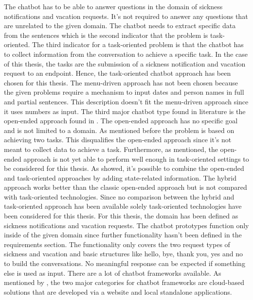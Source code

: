 The chatbot has to be able to answer questions in the domain of sickness notifications 
and vacation requests.
It's not required to answer any questions that are unrelated to the given domain.
The chatbot needs to extract specific data from the sentences which is the second 
indicator that the problem is task-oriented.
The third indicator for a task-oriented problem is that the chatbot has to collect 
information from the 
conversation to achieve a specific task.
In the case of this thesis, the tasks are the submission of a sickness notification
and vacation request to an endpoint. 
Hence, the task-oriented chatbot approach has been chosen for this thesis.
The menu-driven approach has not been chosen because the given problems require a mechanism 
to input dates and person names in full and partial sentences.
This description doesn't fit the menu-driven approach since it uses numbers as input.
The third major chatbot type found in literature is the open-ended approach found in 
\citet{williams2017hybrid, bordes2016learning, rahman2017programming}.
The open-ended approach has no specific goal and is not limited to a domain.
As mentioned before the problem is based on achieving two tasks.
This disqualifies the open-ended approach since it's not meant to
collect data to achieve a task.
Furthermore, as \citet{bordes2016learning} mentioned, the open-ended approach is not 
yet able to perform well enough in task-oriented settings to be considered for this 
thesis.
As \citet{williams2017hybrid} showed, it's possible to combine the open-ended and 
task-oriented approaches by adding state-related information.
The hybrid approach works better than the classic open-ended approach but 
is not compared with task-oriented technologies.
Since no comparison between the hybrid and task-oriented approach has been available 
solely task-oriented technologies have been considered for this thesis.
For this thesis, the domain has been defined as sickness notifications and vacation requests.
The chatbot prototypes function only inside of the given domain since further 
functionality hasn't been defined in the requirements section.
The functionality only covers the two request types of sickness and vacation and basic 
structures like hello, bye, thank you, yes and no to build the conversations.
No meaningful response can be expected if something else is used as input.
There are a lot of chatbot frameworks available.
As mentioned by \citet{kane2016role}, the two major categories for chatbot frameworks 
are cloud-based solutions that are developed via a website and local standalone applications.
